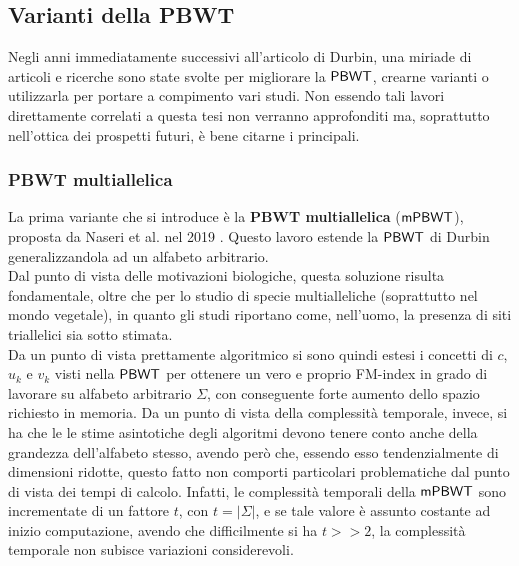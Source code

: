 \subsection{Varianti della PBWT}
Negli anni immediatamente successivi all'articolo di Durbin, una miriade di
articoli e ricerche sono state svolte per migliorare la $\mbox{\rm {\sf PBWT}}$, crearne
varianti o utilizzarla per portare a compimento vari studi. Non essendo tali
lavori direttamente correlati a questa tesi non 
verranno approfonditi ma, soprattutto nell'ottica dei prospetti futuri, è bene
citarne i principali.
\subsubsection{PBWT multiallelica}
La prima variante che si introduce è la \textbf{PBWT multiallelica} ($\mbox{\rm {\sf mPBWT}}$),
proposta da Naseri et al. nel 2019 \cite{mpbwt}. Questo 
lavoro estende la $\mbox{\rm {\sf PBWT}}$ di Durbin generalizzandola ad un alfabeto
arbitrario. \\
Dal punto di vista delle motivazioni biologiche, questa soluzione risulta
fondamentale, oltre che per lo studio di specie multialleliche (soprattutto nel
mondo vegetale), in quanto gli studi riportano come, nell'uomo, la presenza di
siti triallelici sia sotto stimata. \\
Da un punto di vista prettamente algoritmico si sono quindi estesi i concetti di
$c$, $u_k$ e $v_k$ visti nella $\mbox{\rm {\sf PBWT}}$ per ottenere un vero e proprio
FM-index in grado di lavorare su alfabeto arbitrario $\Sigma$, con
conseguente forte aumento dello spazio richiesto in memoria. Da un punto di
vista della complessità temporale, invece, si ha che le le stime asintotiche
degli 
algoritmi devono tenere conto anche della grandezza dell'alfabeto stesso, avendo
però che, essendo esso tendenzialmente di dimensioni ridotte, questo fatto non
comporti particolari problematiche dal punto di vista dei tempi di
calcolo. Infatti, le complessità temporali della $\mbox{\rm {\sf mPBWT}}$ sono incrementate
di un fattore $t$, con $t=\left|\Sigma\right|$, e se tale valore è assunto
costante ad inizio computazione, avendo che difficilmente si ha $t>>2$, la
complessità temporale non subisce variazioni considerevoli.
